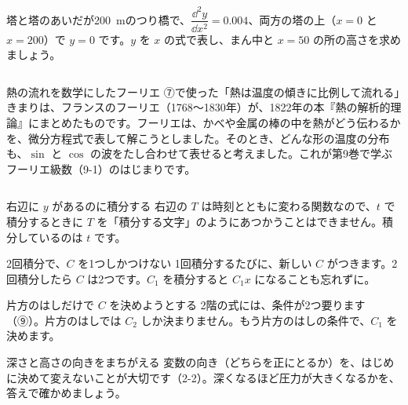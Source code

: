 \begin{jibun}
\raggedright 塔と塔のあいだが\qty{200}{m}のつり橋で、$\dfrac{\dd^2y}{\dd x^2}=0.004$、両方の塔の上（$x=0$ と $x=200$）で $y=0$ です。$y$ を $x$ の式で表し、まん中と $x=50$ の所の高さを求めましょう。
\end{jibun}

\begin{column}{熱の流れを数学にしたフーリエ}
⑦で使った「熱は温度の傾きに比例して流れる」きまりは、フランスのフーリエ（1768〜1830年）が、1822年の本『熱の解析的理論』にまとめたものです。フーリエは、かべや金属の棒の中を熱がどう伝わるかを、微分方程式で表して解こうとしました。そのとき、どんな形の温度の分布も、$\sin$ と $\cos$ の波をたし合わせて表せると考えました。これが第9巻で学ぶフーリエ級数（9-1）のはじまりです。
\end{column}


\begin{tsumazuki}{右辺に $y$ があるのに積分する}
右辺の $T$ は時刻とともに変わる関数なので、$t$ で積分するときに $T$ を「積分する文字」のようにあつかうことはできません。積分しているのは $t$ です。
\end{tsumazuki}

\begin{tsumazuki}{2回積分で、$C$ を1つしかつけない}
1回積分するたびに、新しい $C$ がつきます。2回積分したら $C$ は2つです。$C_1$ を積分すると $C_1x$ になることも忘れずに。
\end{tsumazuki}

\begin{tsumazuki}{片方のはしだけで $C$ を決めようとする}
2階の式には、条件が2つ要ります（⑨）。片方のはしでは $C_2$ しか決まりません。もう片方のはしの条件で、$C_1$ を決めます。
\end{tsumazuki}

\begin{tsumazuki}{深さと高さの向きをまちがえる}
変数の向き（どちらを正にとるか）を、はじめに決めて変えないことが大切です（2-2）。深くなるほど圧力が大きくなるかを、答えで確かめましょう。
\end{tsumazuki}


